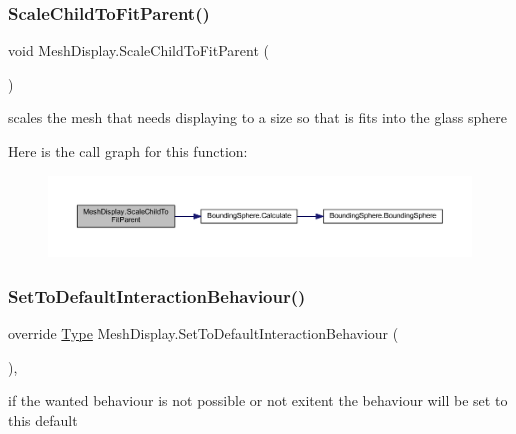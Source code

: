 \subsubsection{\texorpdfstring{Scale\+Child\+To\+Fit\+Parent()}{ScaleChildToFitParent()}}
{\footnotesize\ttfamily void Mesh\+Display.\+Scale\+Child\+To\+Fit\+Parent (\begin{DoxyParamCaption}{ }\end{DoxyParamCaption})}



scales the mesh that needs displaying to a size so that is fits into the glass sphere 

Here is the call graph for this function\+:\nopagebreak
\begin{figure}[H]
\begin{center}
\leavevmode
\includegraphics[width=350pt]{class_mesh_display_a94176ce6e76cc683336051b49573ab1f_cgraph}
\end{center}
\end{figure}
\mbox{\label{class_mesh_display_a8cd58e07cb9d64598c3bbc6701515d1d}} 
\subsubsection{\texorpdfstring{Set\+To\+Default\+Interaction\+Behaviour()}{SetToDefaultInteractionBehaviour()}}
{\footnotesize\ttfamily override \mbox{\hyperlink{class_display_a2c80ba13fff1fd81aaa6915b28e8c14f}{Type}} Mesh\+Display.\+Set\+To\+Default\+Interaction\+Behaviour (\begin{DoxyParamCaption}{ }\end{DoxyParamCaption})\hspace{0.3cm}{\ttfamily [protected]}, {\ttfamily [virtual]}}



if the wanted behaviour is not possible or not exitent the behaviour will be set to this default 



